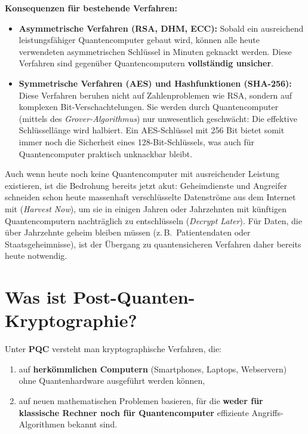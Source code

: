 \noindent
\textbf{Konsequenzen für bestehende Verfahren:}
\begin{itemize}
	\item \textbf{Asymmetrische Verfahren (RSA, DHM, ECC):} Sobald ein ausreichend leistungsfähiger Quantencomputer gebaut wird, können alle heute verwendeten asymmetrischen Schlüssel in Minuten geknackt werden. Diese Verfahren sind gegenüber Quantencomputern \textbf{vollständig unsicher}.
	\item \textbf{Symmetrische Verfahren (AES) und Hashfunktionen (SHA-256):} Diese Verfahren beruhen nicht auf Zahlenproblemen wie RSA, sondern auf komplexen Bit-Verschachtelungen. Sie werden durch Quantencomputer (mittels des \emph{Grover-Algorithmus}) nur unwesentlich geschwächt: Die effektive Schlüssellänge wird halbiert. Ein AES-Schlüssel mit 256 Bit bietet somit immer noch die Sicherheit eines 128-Bit-Schlüssels, was auch für Quantencomputer praktisch unknackbar bleibt.
\end{itemize}

\begin{myremark}\label{rem:harvest-now}
	Auch wenn heute noch keine Quantencomputer mit ausreichender Leistung existieren, ist die Bedrohung bereits jetzt akut: Geheimdienste und Angreifer schneiden schon heute massenhaft verschlüsselte Datenströme aus dem Internet mit (\emph{Harvest Now}), um sie in einigen Jahren oder Jahrzehnten mit künftigen Quantencomputern nachträglich zu entschlüsseln (\emph{Decrypt Later}). Für Daten, die über Jahrzehnte geheim bleiben müssen (z.\,B.\ Patientendaten oder Staatsgeheimnisse), ist der Übergang zu quantensicheren Verfahren daher bereits heute notwendig.
\end{myremark}

\section{Was ist Post-Quanten-Kryptographie?}

Unter \textbf{\gls{PQC}} versteht man kryptographische Verfahren, die:
\begin{enumerate}
	\item auf \textbf{herkömmlichen Computern} (Smartphones, Laptops, Webservern) ohne Quantenhardware ausgeführt werden können,
	\item auf neuen mathematischen Problemen basieren, für die \textbf{weder für klassische Rechner noch für Quantencomputer} effiziente Angriffs-Algorithmen bekannt sind.
\end{enumerate}

